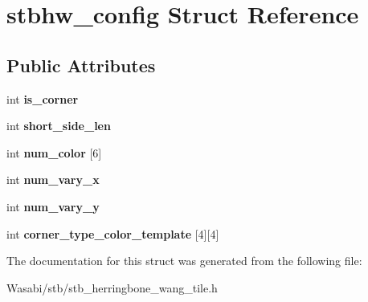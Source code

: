 \hypertarget{structstbhw__config}{}\section{stbhw\+\_\+config Struct Reference}
\label{structstbhw__config}
\subsection*{Public Attributes}
\begin{DoxyCompactItemize}
\item 
int {\bfseries is\+\_\+corner}\hypertarget{structstbhw__config_af306f1baafa662111ccfb852c4a323ce}{}\label{structstbhw__config_af306f1baafa662111ccfb852c4a323ce}

\item 
int {\bfseries short\+\_\+side\+\_\+len}\hypertarget{structstbhw__config_a80e3171458e18085749dc72a0502f747}{}\label{structstbhw__config_a80e3171458e18085749dc72a0502f747}

\item 
int {\bfseries num\+\_\+color} \mbox{[}6\mbox{]}\hypertarget{structstbhw__config_aba57059a9840152056695793f75a0616}{}\label{structstbhw__config_aba57059a9840152056695793f75a0616}

\item 
int {\bfseries num\+\_\+vary\+\_\+x}\hypertarget{structstbhw__config_aedb62208dd1e8635448f5ec788030368}{}\label{structstbhw__config_aedb62208dd1e8635448f5ec788030368}

\item 
int {\bfseries num\+\_\+vary\+\_\+y}\hypertarget{structstbhw__config_adbf21c475a2d3d3120e1a4c7c4193c16}{}\label{structstbhw__config_adbf21c475a2d3d3120e1a4c7c4193c16}

\item 
int {\bfseries corner\+\_\+type\+\_\+color\+\_\+template} \mbox{[}4\mbox{]}\mbox{[}4\mbox{]}\hypertarget{structstbhw__config_acc35b26c433aba4a4fe260bce7b9784b}{}\label{structstbhw__config_acc35b26c433aba4a4fe260bce7b9784b}

\end{DoxyCompactItemize}


The documentation for this struct was generated from the following file\+:\begin{DoxyCompactItemize}
\item 
Wasabi/stb/stb\+\_\+herringbone\+\_\+wang\+\_\+tile.\+h\end{DoxyCompactItemize}
